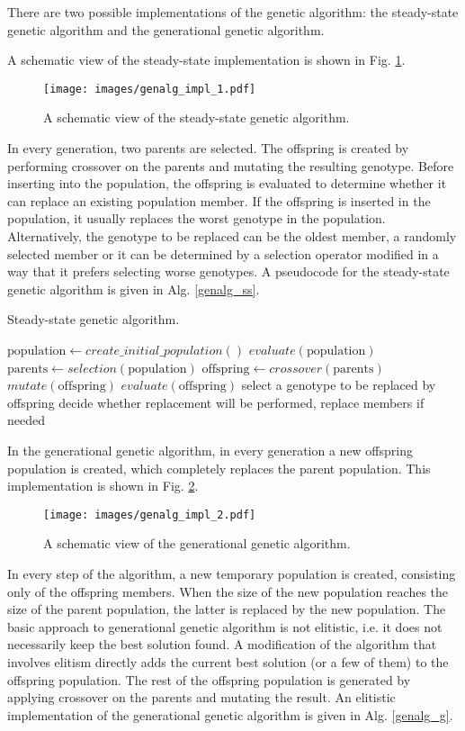 There are two possible implementations of the genetic algorithm: the steady-state genetic algorithm and the generational genetic algorithm.

A schematic view of the steady-state implementation is shown in Fig. \ref{genalg:impl_1}.
\begin{figure}[ht]
    \centering
    \texttt{[image: images/genalg\_impl\_1.pdf]}
    \caption{A schematic view of the steady-state genetic algorithm.}
    \label{genalg:impl_1}
\end{figure}
In every generation, two parents are selected.
The offspring is created by performing crossover on the parents and mutating the resulting genotype.
Before inserting into the population, the offspring is evaluated to determine whether it can replace an existing population member.
If the offspring is inserted in the population, it usually replaces the worst genotype in the population.
Alternatively, the genotype to be replaced can be the oldest member, a randomly selected member or it can be determined by a selection operator modified in a way that it prefers selecting worse genotypes.
A pseudocode for the steady-state genetic algorithm is given in Alg. \ref{genalg_ss}.
\begin{algorithm}
\caption{Steady-state genetic algorithm.\label{genalg_ss}}
\begin{algorithmic}[1]
\State $\text{population} \gets create\_initial\_population()$
\State $evaluate(\text{population})$
\State $\text{parents} \leftarrow selection(\text{population})$
\State $\text{offspring} \leftarrow crossover(\text{parents})$
\State $mutate(\text{offspring})$
\State $evaluate(\text{offspring})$
\State select a genotype to be replaced by offspring
\State decide whether replacement will be performed, replace members if needed
\EndWhile
\end{algorithmic}
\end{algorithm}

In the generational genetic algorithm, in every generation a new offspring population is created, which completely replaces the parent population.
This implementation is shown in Fig. \ref{genalg:impl_2}.
\begin{figure}[ht]
    \centering
    \texttt{[image: images/genalg\_impl\_2.pdf]}
    \caption{A schematic view of the generational genetic algorithm.}
    \label{genalg:impl_2}
\end{figure}
In every step of the algorithm, a new temporary population is created, consisting only of the offspring members.
When the size of the new population reaches the size of the parent population, the latter is replaced by the new population.
The basic approach to generational genetic algorithm is not elitistic, i.e. it does not necessarily keep the best solution found. 
A modification of the algorithm that involves elitism directly adds the current best solution (or a few of them) to the offspring population.
The rest of the offspring population is generated by applying crossover on the parents and mutating the result.
An elitistic implementation of the generational genetic algorithm is given in Alg.
 \ref{genalg_g}.

